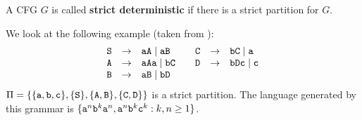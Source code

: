 \begin{defn}
A CFG $G$ is called \textbf{strict deterministic}
if there is a strict partition for $G$.
\end{defn}
We look at the following example
(taken from \cite{harrison:formal}):
\begin{equation}
\begin{array}{l@{\quad\pf\quad}l@{\qquad}l@{\quad\pf\quad}l}
\mbox{\tt S} & \mbox{\tt aA} \mid \mbox{\tt aB} &
	\mbox{\tt C} & \mbox{\tt bC} \mid \mbox{\tt a} \\
\mbox{\tt A} & \mbox{\tt aAa} \mid \mbox{\tt bC} &
	\mbox{\tt D} & \mbox{\tt bDc} \mid \mbox{\tt c} \\
\mbox{\tt B} & \mbox{\tt aB} \mid \mbox{\tt bD} 
\end{array}
\end{equation}
$\Pi = \{\{\mbox{\tt a}, \mbox{\tt b}, \mbox{\tt c}\},
\{\mbox{\tt S}\}, \{\mbox{\tt A}, \mbox{\tt B}\},
\{\mbox{\tt C}, \mbox{\tt D}\}\}$ is a strict partition.
The language generated by this grammar is
$\{\mbox{\tt a}^n \mbox{\tt b}^k \mbox{\tt a}^n,
\mbox{\tt a}^n \mbox{\tt b}^k \mbox{\tt c}^k : k, n \geq 1\}$.

